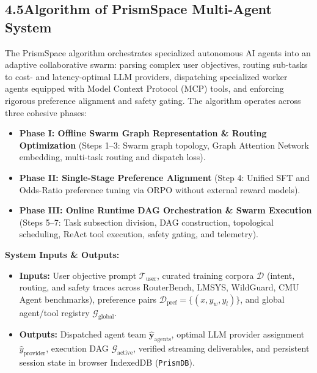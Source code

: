 \documentclass[11pt,a4paper]{article}
\begin{document}

\subsection*{4.5\quad Algorithm of PrismSpace Multi-Agent System}

The PrismSpace algorithm orchestrates specialized autonomous AI agents into an adaptive collaborative swarm: parsing complex user objectives, routing sub-tasks to cost- and latency-optimal LLM providers, dispatching specialized worker agents equipped with Model Context Protocol (MCP) tools, and enforcing rigorous preference alignment and safety gating. The algorithm operates across three cohesive phases:
\begin{itemize}[leftmargin=1.5em, itemsep=0.04em, topsep=0.03em]
    \item \textbf{Phase I: Offline Swarm Graph Representation \& Routing Optimization} (Steps 1--3: Swarm graph topology, Graph Attention Network embedding, multi-task routing and dispatch loss).
    \item \textbf{Phase II: Single-Stage Preference Alignment} (Step 4: Unified SFT and Odds-Ratio preference tuning via ORPO without external reward models).
    \item \textbf{Phase III: Online Runtime DAG Orchestration \& Swarm Execution} (Steps 5--7: Task subsection division, DAG construction, topological scheduling, ReAct tool execution, safety gating, and telemetry).
\end{itemize}

\vspace{0.10em}
\textbf{System Inputs \& Outputs:}
\begin{itemize}[leftmargin=1.5em, itemsep=0.03em, topsep=0.02em]
    \item \textbf{Inputs:} User objective prompt $\mathcal{T}_{\text{user}}$, curated training corpora $\mathcal{D}$ (intent, routing, and safety traces across RouterBench, LMSYS, WildGuard, CMU Agent benchmarks), preference pairs $\mathcal{D}_{\text{pref}} = \{(x, y_w, y_l)\}$, and global agent/tool registry $\mathcal{G}_{\text{global}}$.
    \item \textbf{Outputs:} Dispatched agent team $\hat{\mathbf{y}}_{\text{agents}}$, optimal LLM provider assignment $\hat{y}_{\text{provider}}$, execution DAG $\mathcal{G}_{\text{active}}$, verified streaming deliverables, and persistent session state in browser IndexedDB (\texttt{PrismDB}).
\end{itemize}
\end{document}
